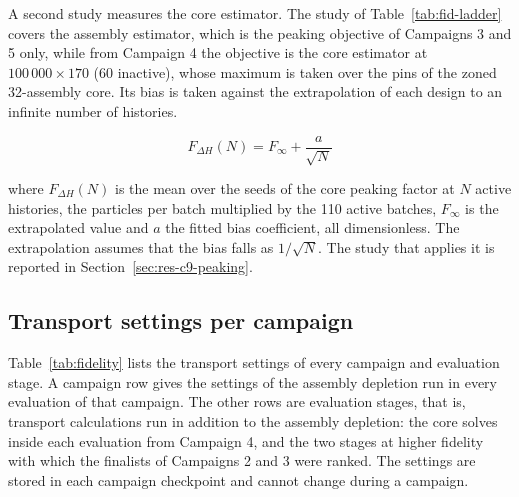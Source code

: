 A second study measures the core estimator. The study of
Table~\ref{tab:fid-ladder} covers the assembly estimator, which is the
peaking objective of Campaigns 3 and 5 only, while from Campaign 4 the
objective is the core estimator at $100\,000\times170$ (60 inactive),
whose maximum is taken over the pins of the zoned 32-assembly core. Its
bias is taken against the extrapolation of each design to an infinite
number of histories.

\begin{equation}
F_{\Delta H}(N) = F_\infty + \frac{a}{\sqrt{N}}
\label{eq:fdh-extrap}
\end{equation}

\noindent where $F_{\Delta H}(N)$ is the mean over the seeds of the core
peaking factor at $N$ active histories, the particles per batch
multiplied by the 110 active batches, $F_\infty$ is the extrapolated
value and $a$ the fitted bias coefficient, all dimensionless. The
extrapolation assumes that the bias falls as $1/\sqrt{N}$. The study
that applies it is reported in Section~\ref{sec:res-c9-peaking}.

\subsection{Transport settings per campaign}
\label{sec:meth-fid-settings}

Table~\ref{tab:fidelity} lists the transport settings of every campaign
and evaluation stage. A campaign row gives the settings of the assembly
depletion run in every evaluation of that campaign. The other rows are
evaluation stages, that is, transport calculations run in addition to
the assembly depletion: the core solves inside each evaluation from
Campaign 4, and the two stages at higher fidelity with which the
finalists of Campaigns 2 and 3 were ranked.
The settings are stored in each campaign checkpoint and cannot change
during a campaign.

